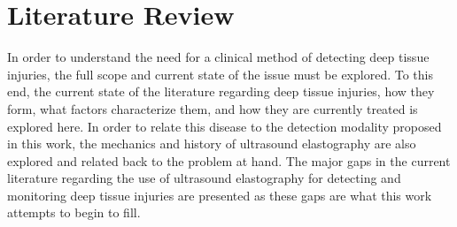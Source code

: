 \chapter{Literature Review}
\label{chap:litreview}
	In order to understand the need for a clinical method of detecting deep tissue injuries, the full scope and current state of the issue must be explored. To this end, the current state of the literature regarding deep tissue injuries, how they form, what factors characterize them, and how they are currently treated is explored here. In order to relate this disease to the detection modality proposed in this work, the mechanics and history of ultrasound elastography are also explored and related back to the problem at hand. The major gaps in the current literature regarding the use of ultrasound elastography for detecting and monitoring deep tissue injuries are presented as these gaps are what this work attempts to begin to fill.

